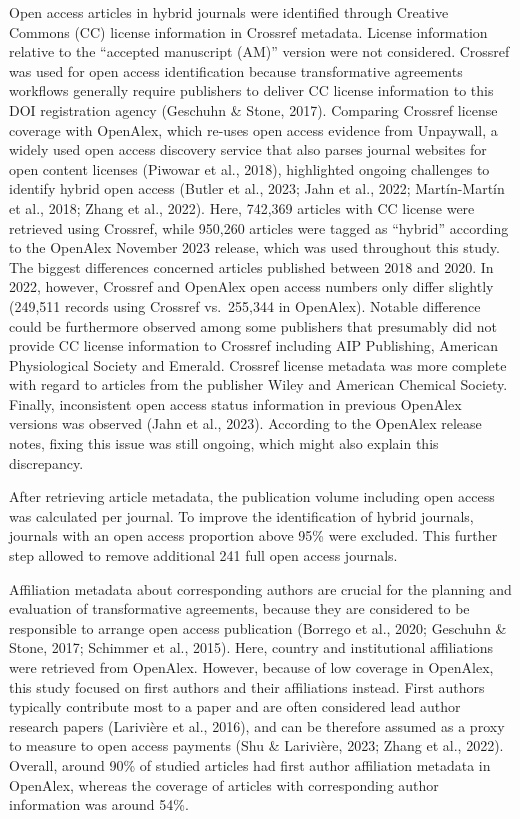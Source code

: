 \documentclass[a4paper,man,floatsintext,longtable,noextraspace,12pt]{apa6}
\begin{document}
Open access articles in hybrid journals were identified through Creative
Commons (CC) license information in Crossref metadata. License
information relative to the ``accepted manuscript (AM)'' version were
not considered. Crossref was used for open access identification because
transformative agreements workflows generally require publishers to
deliver CC license information to this DOI registration agency (Geschuhn
\& Stone, 2017). Comparing Crossref license coverage with OpenAlex,
which re-uses open access evidence from Unpaywall, a widely used open
access discovery service that also parses journal websites for open
content licenses (Piwowar et al., 2018), highlighted ongoing challenges
to identify hybrid open access (Butler et al., 2023; Jahn et al., 2022;
Martín-Martín et al., 2018; Zhang et al., 2022). Here, 742,369 articles
with CC license were retrieved using Crossref, while 950,260 articles
were tagged as ``hybrid'' according to the OpenAlex November 2023
release, which was used throughout this study. The biggest differences
concerned articles published between 2018 and 2020. In 2022, however,
Crossref and OpenAlex open access numbers only differ slightly (249,511
records using Crossref vs.~255,344 in OpenAlex). Notable difference
could be furthermore observed among some publishers that presumably did
not provide CC license information to Crossref including AIP Publishing,
American Physiological Society and Emerald. Crossref license metadata
was more complete with regard to articles from the publisher Wiley and
American Chemical Society. Finally, inconsistent open access status
information in previous OpenAlex versions was observed (Jahn et al.,
2023). According to the OpenAlex release notes, fixing this issue was
still ongoing, which might also explain this discrepancy.

After retrieving article metadata, the publication volume including open
access was calculated per journal. To improve the identification of
hybrid journals, journals with an open access proportion above 95\% were
excluded. This further step allowed to remove additional 241 full open
access journals.

Affiliation metadata about corresponding authors are crucial for the
planning and evaluation of transformative agreements, because they are
considered to be responsible to arrange open access publication (Borrego
et al., 2020; Geschuhn \& Stone, 2017; Schimmer et al., 2015). Here,
country and institutional affiliations were retrieved from OpenAlex.
However, because of low coverage in OpenAlex, this study focused on
first authors and their affiliations instead. First authors typically
contribute most to a paper and are often considered lead author research
papers (Larivière et al., 2016), and can be therefore assumed as a proxy
to measure to open access payments (Shu \& Larivière, 2023; Zhang et
al., 2022). Overall, around 90\% of studied articles had first author
affiliation metadata in OpenAlex, whereas the coverage of articles with
corresponding author information was around 54\%.
\end{document}
